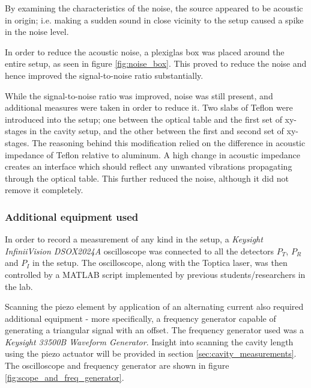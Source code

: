 By examining the characteristics of the noise, the source appeared to be acoustic in origin; i.e. making a sudden sound in close vicinity to the setup caused a spike in the noise level.

In order to reduce the acoustic noise, a plexiglas box was placed around the entire setup, as seen in figure \ref{fig:noise_box}. This proved to reduce the noise and hence improved the signal-to-noise ratio substantially.

While the signal-to-noise ratio was improved, noise was still present, and additional measures were taken in order to reduce it. Two slabs of Teflon were introduced into the setup; one between the optical table and the first set of xy-stages in the cavity setup, and the other between the first and second set of xy-stages. The reasoning behind this modification relied on the difference in acoustic impedance of Teflon relative to aluminum. A high change in acoustic impedance creates an interface which should reflect any unwanted vibrations propagating through the optical table. This further reduced the noise, although it did not remove it completely. 

\subsubsection{Additional equipment used}

In order to record a measurement of any kind in the setup, a \emph{Keysight InfiniiVision DSOX2024A}\cite{oscilloscope} oscilloscope was connected to all the detectors $P_T$, $P_R$ and $P_I$ in the setup. The oscilloscope, along with the Toptica laser, was then controlled by a MATLAB script implemented by previous students/researchers in the lab. 

Scanning the piezo element by application of an alternating current also required additional equipment - more specifically, a frequency generator capable of generating a triangular signal with an offset. The frequency generator used was a \emph{Keysight 33500B Waveform Generator}\cite{frequency_generator}. Insight into scanning the cavity length using the piezo actuator will be provided in section \ref{sec:cavity_measurements}. The oscilloscope and frequency generator are shown in figure \ref{fig:scope_and_freq_generator}.

